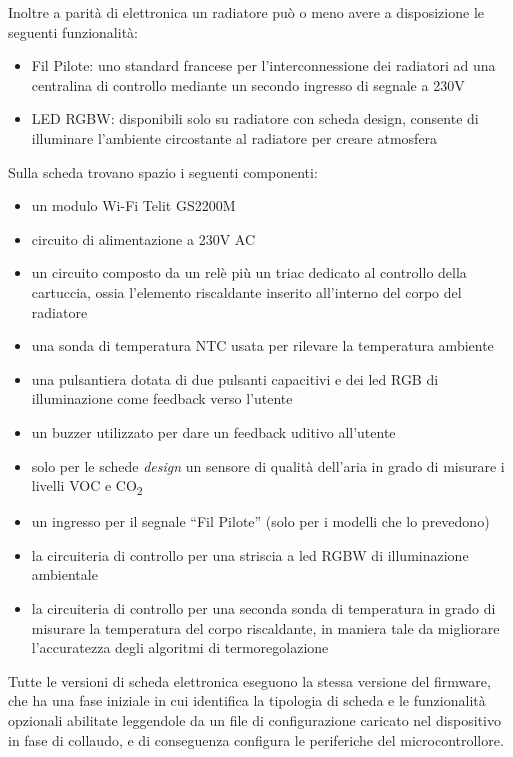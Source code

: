 \documentclass[12pt,a4paper,twoside,titlepage]{book}
\begin{document}
Inoltre a parità di elettronica un radiatore può o meno avere a disposizione le
seguenti funzionalità:
\begin{itemize}
    \item Fil Pilote: uno standard francese per l'interconnessione dei radiatori ad una
        centralina di controllo mediante un secondo ingresso di segnale a 230V
    \item LED RGBW: disponibili solo su radiatore con scheda design, consente di
        illuminare l'ambiente circostante al radiatore per creare atmosfera
\end{itemize}

Sulla scheda trovano spazio i seguenti componenti:

\begin{itemize}
    \item un modulo Wi-Fi Telit GS2200M
    \item circuito di alimentazione a 230V AC
    \item un circuito composto da un relè più un triac dedicato al controllo della
        cartuccia, ossia l'elemento riscaldante inserito all'interno del corpo del radiatore
    \item una sonda di temperatura NTC usata per rilevare la temperatura ambiente
    \item una pulsantiera dotata di due pulsanti capacitivi e dei led RGB di illuminazione
        come feedback verso l'utente
    \item un buzzer utilizzato per dare un feedback uditivo all'utente
    \item solo per le schede \textit{design} un sensore di qualità dell'aria in grado di
        misurare i livelli VOC e CO\textsubscript{2}
    \item un ingresso per il segnale ``Fil Pilote'' (solo per i modelli che lo prevedono)
    \item la circuiteria di controllo per una striscia a led RGBW di illuminazione ambientale
    \item la circuiteria di controllo per una seconda sonda di temperatura in grado di
        misurare la temperatura del corpo riscaldante, in maniera tale da migliorare
        l'accuratezza degli algoritmi di termoregolazione
\end{itemize}

Tutte le versioni di scheda elettronica eseguono la stessa versione del firmware,
che ha una fase iniziale in cui identifica la tipologia di scheda e le funzionalità
opzionali abilitate leggendole da un file di configurazione caricato nel dispositivo
in fase di collaudo, e di conseguenza configura le periferiche del microcontrollore.
\end{document}
